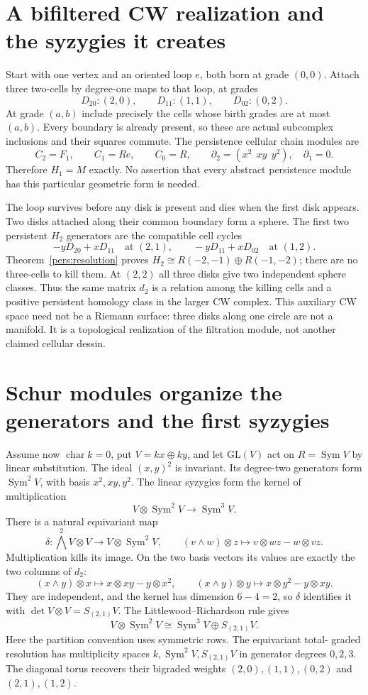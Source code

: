 \documentclass[11pt,oneside,openany]{book}
\theoremstyle{definition}\newtheorem{definition}[theorem]{Definition}
\theoremstyle{remark}\newtheorem{remark}[theorem]{Remark}
\begin{document}
\section{A bifiltered CW realization and the syzygies it creates}
Start with one vertex and an oriented loop $e$, both born at grade $(0,0)$.
Attach three two-cells by degree-one maps to that loop, at grades
\[
 D_{20}:(2,0),\qquad D_{11}:(1,1),\qquad D_{02}:(0,2).
\]
At grade $(a,b)$ include precisely the cells whose birth grades are at
most $(a,b)$. Every boundary is already present, so these are actual
subcomplex inclusions and their squares commute. The persistence cellular
chain modules are
\[
 C_2=F_1,\qquad C_1=R e,\qquad C_0=R,\qquad
 \partial_2=(x^2\ \ xy\ \ y^2),\quad\partial_1=0.
\]
Therefore $H_1=M$ exactly. No assertion that every abstract persistence
module has this particular geometric form is needed.

The loop survives before any disk is present and dies when the first disk
appears. Two disks attached along their common boundary form a sphere.
The first two persistent $H_2$ generators are the compatible cell cycles
\[
 -yD_{20}+xD_{11}\quad\text{at }(2,1),\qquad
 -yD_{11}+xD_{02}\quad\text{at }(1,2).
\]
Theorem~\ref{pers:resolution} proves
$H_2\cong R(-2,-1)\oplus R(-1,-2)$; there are no three-cells to kill
them. At $(2,2)$ all three disks give two independent sphere classes.
Thus the same matrix $d_2$ is a relation among the killing cells and a
positive persistent homology class in the larger CW complex.
This auxiliary CW space need not be a Riemann surface: three disks along
one circle are not a manifold. It is a topological realization of the
filtration module, not another claimed cellular dessin.

\section{Schur modules organize the generators and the first syzygies}
Assume now $\operatorname{char}k=0$, put $V=kx\oplus ky$, and let
$\mathrm{GL}(V)$ act on $R=\operatorname{Sym}V$ by linear substitution.
The ideal $(x,y)^2$ is invariant. Its degree-two generators form
$\operatorname{Sym}^2V$, with basis $x^2,xy,y^2$.
The linear syzygies form the kernel of multiplication
\[
 V\otimes\operatorname{Sym}^2V\longrightarrow\operatorname{Sym}^3V.
\]
There is a natural equivariant map
\[
 \delta:\bigwedge^2V\otimes V\longrightarrow V\otimes\operatorname{Sym}^2V,
 \qquad (v\wedge w)\otimes z\longmapsto
       v\otimes wz-w\otimes vz.
\]
Multiplication kills its image. On the two basis vectors its values are
exactly the two columns of $d_2$:
\[
 (x\wedge y)\otimes x\mapsto x\otimes xy-y\otimes x^2,
 \qquad
 (x\wedge y)\otimes y\mapsto x\otimes y^2-y\otimes xy.
\]
They are independent, and the kernel has dimension $6-4=2$, so $\delta$
identifies it with $\det V\otimes V=S_{(2,1)}V$. The Littlewood--Richardson
rule gives
\[
 V\otimes\operatorname{Sym}^2V
 \cong\operatorname{Sym}^3V\oplus S_{(2,1)}V.
\]
Here the partition convention uses symmetric rows. The equivariant total-
graded resolution has multiplicity spaces
$k,\operatorname{Sym}^2V,S_{(2,1)}V$ in generator degrees $0,2,3$.
The diagonal torus recovers their bigraded weights
$(2,0),(1,1),(0,2)$ and $(2,1),(1,2)$.
\end{document}
